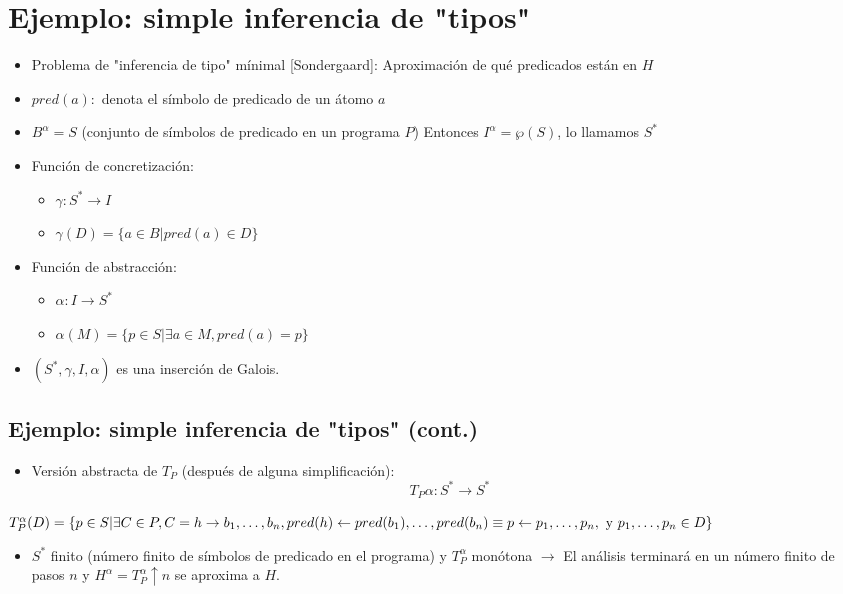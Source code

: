 \documentclass[11pt]{article}
\begin{document}
\section*{Ejemplo: simple inferencia de "tipos"}
\label{sec:orgbe8f2d2}
\begin{itemize}
\item Problema de "inferencia de tipo" mínimal [Sondergaard]: Aproximación
de qué predicados están en \(H\)
\item \(pred(a):\) denota el símbolo de predicado de un átomo \(a\)
\item \(B^\alpha = S\) (conjunto de símbolos de predicado en un programa
\(P\)) Entonces \(I^\alpha = \wp(S)\), lo llamamos \(S^*\)
\item Función de concretización:
\begin{itemize}
\item \(\gamma: S^* \rightarrow I\)
\item \(\gamma(D) = \{a \in B | pred(a) \in D \}\)
\end{itemize}
\item Función de abstracción:
\begin{itemize}
\item \(\alpha: I \rightarrow S^*\)
\item \(\alpha(M) = \{p \in S | \exists a \in M, pred(a) = p \}\)
\end{itemize}
\item \((S^*, \gamma, I, \alpha)\) es una inserción de Galois.
\end{itemize}

\subsection*{Ejemplo: simple inferencia de "tipos" (cont.)}
\label{sec:org8bab637}
\begin{itemize}
\item Versión abstracta de \(T_P\) (después de alguna simplificación): $$T_P
  \alpha: S^* \rightarrow S^*$$
\end{itemize}

\(T^\alpha_P(D) = \{p \in S | \exists C \in P, 
                     C = h \rightarrow b_1, \ldots, b_n, \\
                     pred(h) \leftarrow pred(b_1), \ldots , pred(b_n)
                     \equiv p \leftarrow p_1,\ldots , p_n, \\
                     \mbox{ y } p_1,\ldots , p_n \in D\}\)
\begin{itemize}
\item \(S^*\) finito (número finito de símbolos de predicado en el programa)
y \(T^\alpha_P\) monótona \(\to\) El análisis terminará en un número
finito de pasos \(n\) y \(H^\alpha = T^\alpha_P \uparrow n\) se aproxima a \(H\).
\end{itemize}
\end{document}

